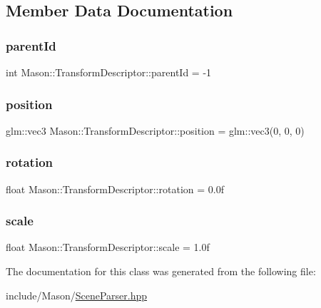\subsection{Member Data Documentation}
\hypertarget{class_mason_1_1_transform_descriptor_ae83bf1f16969979cb24e2ae9d1eb3134}{}\label{class_mason_1_1_transform_descriptor_ae83bf1f16969979cb24e2ae9d1eb3134} 
\subsubsection{\texorpdfstring{parent\+Id}{parentId}}
{\footnotesize\ttfamily int Mason\+::\+Transform\+Descriptor\+::parent\+Id = -\/1}

\hypertarget{class_mason_1_1_transform_descriptor_acce622c3f89ae5b081c61feabc1319bf}{}\label{class_mason_1_1_transform_descriptor_acce622c3f89ae5b081c61feabc1319bf} 
\subsubsection{\texorpdfstring{position}{position}}
{\footnotesize\ttfamily glm\+::vec3 Mason\+::\+Transform\+Descriptor\+::position = glm\+::vec3(0, 0, 0)}

\hypertarget{class_mason_1_1_transform_descriptor_aae276979ce993523996db1c9192d8cf8}{}\label{class_mason_1_1_transform_descriptor_aae276979ce993523996db1c9192d8cf8} 
\subsubsection{\texorpdfstring{rotation}{rotation}}
{\footnotesize\ttfamily float Mason\+::\+Transform\+Descriptor\+::rotation = 0.\+0f}

\hypertarget{class_mason_1_1_transform_descriptor_a8fe9d0ecd10d501dc956fae07b252dc8}{}\label{class_mason_1_1_transform_descriptor_a8fe9d0ecd10d501dc956fae07b252dc8} 
\subsubsection{\texorpdfstring{scale}{scale}}
{\footnotesize\ttfamily float Mason\+::\+Transform\+Descriptor\+::scale = 1.\+0f}



The documentation for this class was generated from the following file\+:\begin{DoxyCompactItemize}
\item 
include/\+Mason/\hyperlink{_scene_parser_8hpp}{Scene\+Parser.\+hpp}\end{DoxyCompactItemize}
